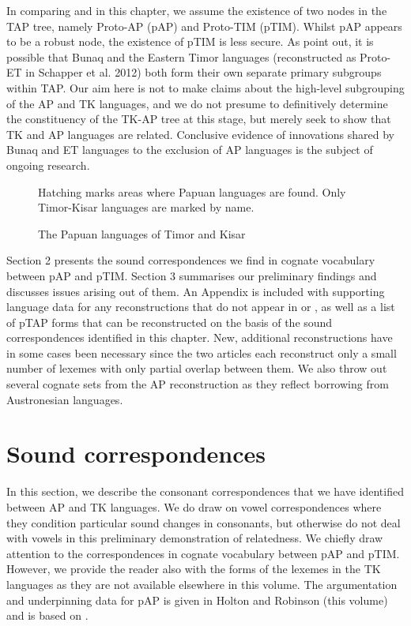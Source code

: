 In comparing \citet{HoltonEtAl2012} and \citet{SchapperEtAl2012} in this chapter, we assume the existence of two nodes in the TAP tree, namely Proto-AP (pAP) and Proto-TIM (pTIM). Whilst pAP appears to be a robust node, the existence of pTIM is less secure. As \citet[227-228]{SchapperEtAl2012} point out, it is possible that Bunaq and the Eastern Timor languages (reconstructed as Proto-ET in Schapper et al. 2012) both form their own separate primary subgroups within TAP. Our aim here is not to make claims about the high-level subgrouping of the AP and TK languages, and we do not presume to definitively determine the constituency of the TK-AP tree at this stage, but merely seek to show that TK and AP languages are related. Conclusive evidence of innovations shared by Bunaq and ET languages to the exclusion of AP languages is the subject of ongoing research.

\begin{figure}
\caption{The Papuan languages of Timor and Kisar {\dag}}
{\dag} Hatching marks areas where Papuan languages are found. Only Timor-Kisar languages are marked by name.
\end{figure}

Section 2 presents the sound correspondences we find in cognate vocabulary between pAP and pTIM. Section 3 summarises our preliminary findings and discusses issues arising out of them. An Appendix is included with supporting language data for any reconstructions that do not appear in \citet{HoltonEtAl2012} or \citet{SchapperEtAl2012}, as well as a list of pTAP forms that can be reconstructed on the basis of the sound correspondences identified in this chapter. New, additional reconstructions have in some cases been necessary since the two articles each reconstruct only a small number of lexemes with only partial overlap between them. We also throw out several cognate sets from the AP reconstruction as they reflect borrowing from Austronesian languages.

\section{Sound correspondences}
In this section, we describe the consonant correspondences that we have identified between AP and TK languages. We do draw on vowel correspondences where they condition particular sound changes in consonants, but otherwise do not deal with vowels in this preliminary demonstration of relatedness. We chiefly draw attention to the correspondences in cognate vocabulary between pAP and pTIM. However, we provide the reader also with the forms of the lexemes in the TK languages as they are not available elsewhere in this volume. The argumentation and underpinning data for pAP is given in Holton and Robinson (this volume) and is based on \citet{HoltonEtAl2012}.

